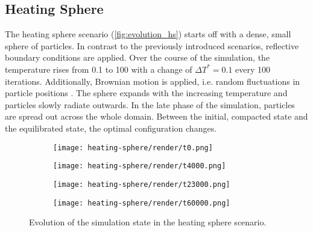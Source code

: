 \subsection{Heating Sphere}
\label{subsec:scenario_hs}
The heating sphere scenario (\autoref{fig:evolution_hs}) starts off with a dense, small sphere of particles. In contrast to the previously introduced scenarios, reflective boundary conditions are applied. Over the course of the simulation, the temperature rises from \num{0.1} to \num{100} with a change of $\Delta \si{T^{*}}=0.1$ every \num{100} iterations. Additionally, Brownian motion is applied, i.e. random fluctuations in particle positions \cite{Moerters2010}. The sphere expands with the increasing temperature and particles slowly radiate outwards. In the late phase of the simulation, particles are spread out across the whole domain.
Between the initial, compacted state and the equilibrated state, the optimal configuration changes.

\begin{figure}[htpb]
	\centering
	\fastcolorbarhor

	\begin{subfigure}[c]{.25\textwidth}
		\texttt{[image: heating-sphere/render/t0.png]}
	\end{subfigure}%
	\begin{subfigure}[c]{.25\textwidth}
		\texttt{[image: heating-sphere/render/t4000.png]}
	\end{subfigure}%
	\begin{subfigure}[c]{.25\textwidth}
		\texttt{[image: heating-sphere/render/t23000.png]}
	\end{subfigure}%
	\begin{subfigure}[c]{.25\textwidth}
		\vspace*{0.1\textwidth}
		\centering
		\texttt{[image: heating-sphere/render/t60000.png]}
		\vspace*{0.1\textwidth}
	\end{subfigure}%
	\caption{Evolution of the simulation state in the heating sphere scenario.}
	\label{fig:evolution_hs}
\end{figure}

